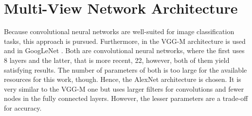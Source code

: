 \section{Multi-View Network Architecture}
\label{sec:methods-architecture}
Because convolutional neural networks are well-suited for image classification tasks, this approach is pursued.
Furthermore, in \cite{Su:2015:MCN:2919332.2919750} the VGG-M \cite{journals/corr/ChatfieldSVZ14} architecture is used and in \cite{Feng2018} GoogLeNet \cite{szegedy2015}.
Both are convolutional neural networks, where the first uses 8 layers and the latter, that is more recent, 22, however, both of them yield satisfying results.
The number of parameters of both is too large for the available resources for this work, though.
Hence, the AlexNet architecture \cite{Krizhevsky:2012:ICD:2999134.2999257} is chosen.
It is very similar to the VGG-M one but uses larger filters for convolutions and fewer nodes in the fully connected layers.
However, the lesser parameters are a trade-off for accuracy.

